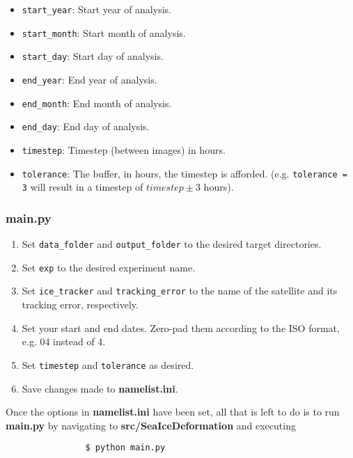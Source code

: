 \documentclass{article}
\begin{document}
\begin{itemize}
            \begin{itemize}
                \item \verb?start_year?: Start year of analysis.
                \item \verb?start_month?: Start month of analysis.
                \item \verb?start_day?: Start day of analysis.
                \item \verb?end_year?: End year of analysis.
                \item \verb?end_month?: End month of analysis.
                \item \verb?end_day?: End day of analysis.
                \item \verb?timestep?: Timestep (between images) in hours.
                \item \verb?tolerance?: The buffer, in hours, the timestep is afforded. (e.g. \verb?tolerance = 3? will result in a timestep of $timestep \pm 3$ hours).
            \end{itemize}
        \end{itemize}

        \subsubsection{\textbf{main.py}}

            \begin{enumerate}
                \item Set \verb?data_folder? and \verb?output_folder? to the desired target directories.
                \item Set \verb?exp? to the desired experiment name.
                \item Set \verb?ice_tracker? and \verb?tracking_error? to the name of the satellite and its tracking error, respectively.
                \item Set your start and end dates. Zero-pad them according to the ISO format, e.g. 04 instead of 4.
                \item Set \verb?timestep? and \verb?tolerance? as desired.
                \item Save changes made to \textbf{namelist.ini}.
            \end{enumerate}

            Once the options in \textbf{namelist.ini} have been set, all that is left to do is to run \textbf{main.py} by navigating to \textbf{src/SeaIceDeformation} and executing
            \begin{verbatim}
                $ python main.py
            \end{verbatim}
\end{document}
